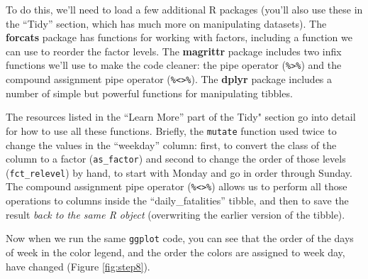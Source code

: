 \documentclass[]{tufte-book}
\newenvironment{Shaded}{}{}
\newcommand{\DataTypeTok}[1]{\textcolor[rgb]{0.56,0.13,0.00}{#1}}
\newcommand{\KeywordTok}[1]{\textcolor[rgb]{0.00,0.44,0.13}{\textbf{#1}}}
\newcommand{\NormalTok}[1]{#1}
\newcommand{\OperatorTok}[1]{\textcolor[rgb]{0.40,0.40,0.40}{#1}}
\newcommand{\StringTok}[1]{\textcolor[rgb]{0.25,0.44,0.63}{#1}}
\begin{document}
To do this, we'll need to load a few additional R packages (you'll also use these
in the ``Tidy'' section, which has much more on manipulating datasets). The
\textbf{forcats} package \citep{R-forcats} has functions for working with factors, including
a function we can use to reorder the factor levels. The \textbf{magrittr} package
\citep{R-magrittr} includes two infix functions we'll use to make the code
cleaner: the pipe operator (\texttt{\%\textgreater{}\%}) and the compound assignment pipe operator (\texttt{\%\textless{}\textgreater{}\%}).
The \textbf{dplyr} package \citep{R-dplyr} includes a number of simple but powerful functions
for manipulating tibbles.

The resources listed in the ``Learn More'' part of the Tidy" section go into detail for how
to use all these functions. Briefly, the \texttt{mutate} function used twice to change the
values in the ``weekday'' column:
first, to convert the class of the column to a factor (\texttt{as\_factor}) and second to
change the order of those levels (\texttt{fct\_relevel}) by hand, to start with Monday and
go in order through Sunday. The compound assignment pipe operator (\texttt{\%\textless{}\textgreater{}\%}) allows
us to perform all those operations to columns inside the ``daily\_fatalities'' tibble,
and then to save the result \emph{back to the same R object} (overwriting the earlier
version of the tibble).

\begin{Shaded}
\end{Shaded}

Now when we run the same \texttt{ggplot} code, you can see that the order of the days of
week in the color legend, and the order the colors are assigned to week day, have
changed (Figure \ref{fig:step8}).
\end{document}
